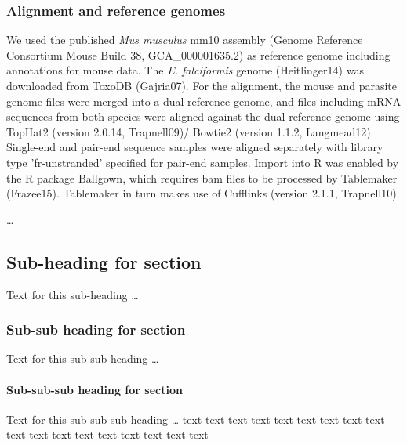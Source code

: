 \documentclass{bmcart}
\begin{document}
\subsubsection*{Alignment and reference genomes}
We used the published \textit{Mus musculus} mm10 assembly (Genome Reference Consortium Mouse 
Build 38, GCA\_000001635.2) as reference genome including annotations for mouse data. The
\textit{E. falciformis} genome (Heitlinger14) was downloaded from ToxoDB (Gajria07). For the
alignment, the mouse and parasite genome files were merged into a dual reference genome, and 
files including mRNA sequences from both species were aligned against the dual reference genome
using TopHat2 (version 2.0.14, Trapnell09)/ Bowtie2 (version 1.1.2, Langmead12). Single-end and 
pair-end sequence samples were aligned separately with library type 'fr-unstranded' specified 
for pair-end samples. Import into R was enabled by the R package Ballgown, which requires bam 
files to be processed by Tablemaker (Frazee15). Tablemaker in turn makes use of Cufflinks 
(version 2.1.1, Trapnell10).

\ldots


\subsection*{Sub-heading for section}
Text for this sub-heading \ldots
\subsubsection*{Sub-sub heading for section}
Text for this sub-sub-heading \ldots
\paragraph*{Sub-sub-sub heading for section}
Text for this sub-sub-sub-heading \ldots
text text text
text text text
text text text
text text text
text text text
text text text
\end{document}
